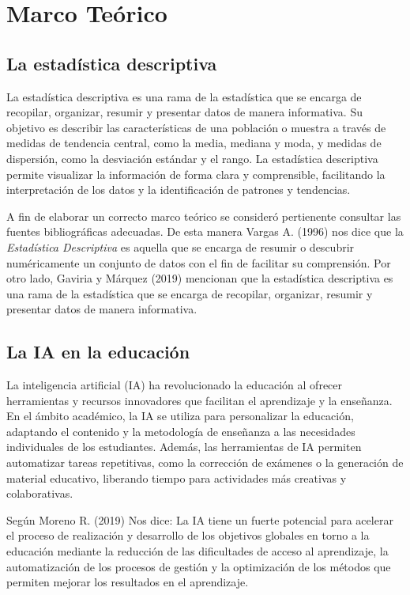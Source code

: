 \section{Marco Teórico}

  \subsection{La estadística descriptiva}

  La estadística descriptiva es una rama de la estadística que se encarga de recopilar, organizar, resumir y presentar datos de manera informativa. Su objetivo es describir las características de una población o muestra a través de medidas de tendencia central, como la media, mediana y moda, y medidas de dispersión, como la desviación estándar y el rango. La estadística descriptiva permite visualizar la información de forma clara y comprensible, facilitando la interpretación de los datos y la identificación de patrones y tendencias.

  A fin de elaborar un correcto marco teórico se consideró pertienente consultar las fuentes bibliográficas adecuadas. De esta manera Vargas A. (1996) nos dice que la \textit{Estadística Descriptiva} es aquella que se encarga de resumir o descubrir numéricamente un conjunto de datos con el fin de facilitar su comprensión. Por otro lado, Gaviria y Márquez (2019) mencionan que la estadística descriptiva es una rama de la estadística que se encarga de recopilar, organizar, resumir y presentar datos de manera informativa.

  \subsection{La IA en la educación}

  La inteligencia artificial (IA) ha revolucionado la educación al ofrecer herramientas y recursos innovadores que facilitan el aprendizaje y la enseñanza. En el ámbito académico, la IA se utiliza para personalizar la educación, adaptando el contenido y la metodología de enseñanza a las necesidades individuales de los estudiantes. Además, las herramientas de IA permiten automatizar tareas repetitivas, como la corrección de exámenes o la generación de material educativo, liberando tiempo para actividades más creativas y colaborativas.

  Según Moreno R. (2019) Nos dice: La IA tiene un fuerte potencial para acelerar el proceso de realización y desarrollo de los objetivos globales en torno a la educación mediante la reducción de las dificultades de acceso al aprendizaje, la automatización de los procesos de gestión y la optimización de los métodos que permiten mejorar los resultados en el aprendizaje.

